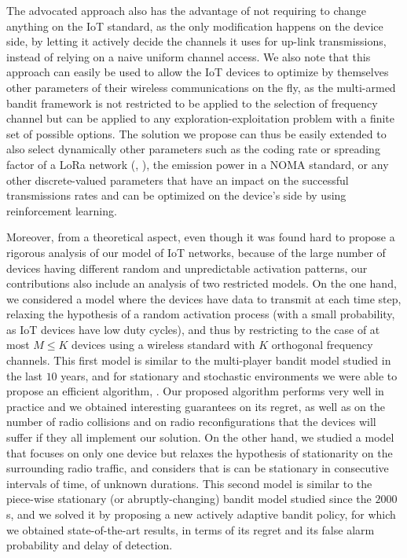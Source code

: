 The advocated approach also has the advantage of not requiring to change anything on the IoT standard, as the only modification happens on the device side, by letting it actively decide the channels it uses for up-link transmissions, instead of relying on a naive uniform channel access.
%
We also note that this approach can easily be used to allow the IoT devices to optimize by themselves other parameters of their wireless communications on the fly, as the multi-armed bandit framework is not restricted to be applied to the selection of frequency channel but can be applied to any exploration-exploitation problem with a finite set of possible options.
The solution we propose can thus be easily extended to also select dynamically other parameters such as the coding rate or spreading factor of a LoRa network (\eg, \cite{KerkoucheAlami18}), the emission power in a NOMA standard, or any other discrete-valued parameters that have an impact on the successful transmissions rates and can be optimized on the device's side by using reinforcement learning.


Moreover, from a theoretical aspect, even though it was found hard to propose a rigorous analysis of our model of IoT networks, because of the large number of devices having different random and unpredictable activation patterns, our contributions also include an analysis of two restricted models.
%
On the one hand, we considered a model where the devices have data to transmit at each time step, relaxing the hypothesis of a random activation process (with a small probability, as IoT devices have low duty cycles), and thus by restricting to the case of at most $M \leq K$ devices using a wireless standard with $K$ orthogonal frequency channels.
This first model is similar to the multi-player bandit model studied in the last $10$ years, and for stationary and stochastic environments we were able to propose an efficient algorithm, \MCTopM.
Our proposed algorithm performs very well in practice and we obtained interesting guarantees on its regret, as well as on the number of radio collisions and on radio reconfigurations that the devices will suffer if they all implement our solution.
%
On the other hand, we studied a model that focuses on only one device but relaxes the hypothesis of stationarity on the surrounding radio traffic, and considers that is can be stationary in consecutive intervals of time, of unknown durations. This second model is similar to the piece-wise stationary (or abruptly-changing) bandit model studied since the $2000$s, and we solved it by proposing a new actively adaptive bandit policy, for which we obtained state-of-the-art results, in terms of its regret and its false alarm probability and delay of detection.

